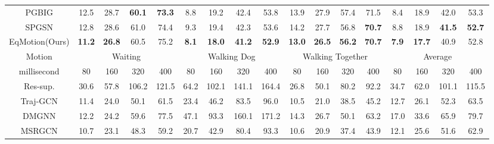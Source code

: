 \documentclass[10pt,twocolumn,letterpaper]{article}
\begin{document}
\begin{table*}[t]
{\begin{tabular}{c|cccc|cccc|cccc|cccc}
PGBIG                &   {12.5} &   {28.7} &   \textbf{60.1} &   \textbf{73.3} &   {8.8}  &   {19.2} &   {42.4} &  53.8 &   {13.9} &   {27.9} &   {57.4} &   {71.5} &   {8.4}  &   {18.9} &   {42.0} &   {53.3} \\ 
SPGSN                & 12.8 &28.6 &61.0& 74.4         & 9.3& 19.4 &{42.3}& {53.6}          & 14.2 &27.7& 56.8& \textbf{70.7}       & 8.8& 18.9& \textbf{41.5}& \textbf{52.7}              \\ 
EqMotion(Ours) &\textbf{11.2} &\textbf{26.8} &{60.5} &75.2&\textbf{8.1}& \textbf{18.0} &\textbf{41.2}& \textbf{52.9}&\textbf{13.0}& \textbf{26.5}& \textbf{56.2}& \textbf{70.7}&\textbf{7.9}& \textbf{17.7}& 40.9& 52.8 \\\hline
Motion           & \multicolumn{4}{c|}{Waiting}                                   & \multicolumn{4}{c|}{Walking Dog}                                & \multicolumn{4}{c|}{Walking Together}                           & \multicolumn{4}{c}{Average}                                       \\ \hline
millisecond        & 80           & 160          & 320          & 400          & 80           & 160          & 320          & 400          & 80           & 160          & 320          & 400          & 80           & 160          & 320          & 400          \\ \hline
Res-sup.          & 30.6          & 57.8          & 106.2         & 121.5         & 64.2          & 102.1         & 141.1         & 164.4         & 26.8          & 50.1          & 80.2          & 92.2          & 34.7          & 62.0          & 101.1         & 115.5         \\
Traj-GCN                & 11.4          & 24.0          & 50.1          & 61.5          & 23.4          & 46.2          & 83.5          & 96.0          &  10.5          & 21.0          & 38.5          & 45.2          & 12.7          & 26.1          & 52.3          & 63.5          \\
DMGNN              & 12.2          & 24.2          & 59.6          & 77.5          & 47.1          & 93.3          & 160.1         & 171.2         & 14.3          & 26.7          & 50.1          & 63.2          & 17.0          & 33.6          & 65.9          & 79.7          \\
MSRGCN                &  10.7          &  23.1          &  48.3          & 59.2          &  20.7          &  42.9          &  80.4          &  93.3          & 10.6          &  20.9          &  37.4         &  43.9          &  12.1          &  25.6          &  51.6          &  62.9         \\



\end{tabular}}
\end{table*}
\end{document}

